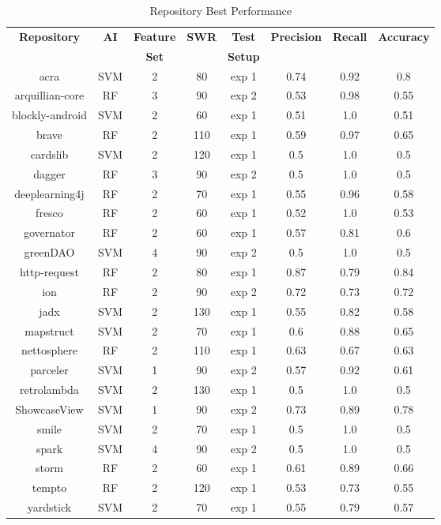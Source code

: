 \begin{table}
\begin{center}
    \begin{tabular}{|c||c|c|c|c||c|c|c|}
        \hline
        \textbf{Repository} & \textbf{AI} & \textbf{Feature} & \textbf{SWR} & \textbf{Test} & \textbf{Precision} & \textbf{Recall} & \textbf{Accuracy} \\
         & & \textbf{Set} & & \textbf{Setup} & & & \\
        \hline
        acra & SVM & 2 & 80 & exp 1 & 0.74 & 0.92 & 0.8 \\          %
        arquillian-core & RF & 3 & 90 & exp 2 & 0.53 & 0.98 & 0.55 \\
        blockly-android & SVM & 2 & 60 & exp 1 & 0.51 & 1.0 & 0.51 \\
        brave & RF & 2 & 110 & exp 1 & 0.59 & 0.97 & 0.65 \\
        cardslib & SVM & 2 & 120 & exp 1 & 0.5 & 1.0 & 0.5 \\
        dagger & RF & 3 & 90 & exp 2 & 0.5 & 1.0 & 0.5 \\
        deeplearning4j & RF & 2 & 70 & exp 1 & 0.55 & 0.96 & 0.58 \\
        fresco & RF & 2 & 60 & exp 1 & 0.52 & 1.0 & 0.53 \\
        governator & RF & 2 & 60 & exp 1 & 0.57 & 0.81 & 0.6 \\
        greenDAO & SVM & 4 & 90 & exp 2 & 0.5 & 1.0 & 0.5 \\
        http-request & RF & 2 & 80 & exp 1 & 0.87 & 0.79 & 0.84 \\   %
        ion & RF & 2 & 90 & exp 2 & 0.72 & 0.73 & 0.72 \\            %
        jadx & SVM & 2 & 130 & exp 1 & 0.55 & 0.82 & 0.58 \\
        mapstruct & SVM & 2 & 70 & exp 1 & 0.6 & 0.88 & 0.65 \\
        nettosphere & RF & 2 & 110 & exp 1 & 0.63 & 0.67 & 0.63 \\
        parceler & SVM & 1 & 90 & exp 2 & 0.57 & 0.92 & 0.61 \\
        retrolambda & SVM & 2 & 130 & exp 1 & 0.5 & 1.0 & 0.5 \\
        ShowcaseView & SVM & 1 & 90 & exp 2 & 0.73 & 0.89 & 0.78 \\  %
        smile & SVM & 2 & 70 & exp 1 & 0.5 & 1.0 & 0.5 \\
        spark & SVM & 4 & 90 & exp 2 & 0.5 & 1.0 & 0.5 \\
        storm & RF & 2 & 60 & exp 1 & 0.61 & 0.89 & 0.66 \\
        tempto & RF & 2 & 120 & exp 1 & 0.53 & 0.73 & 0.55 \\
        yardstick & SVM & 2 & 70 & exp 1 & 0.55 & 0.79 & 0.57 \\
        \hline
    \end{tabular}
\end{center}
\caption{Repository Best Performance}
\label{tab:repository_performance}
\end{table}

